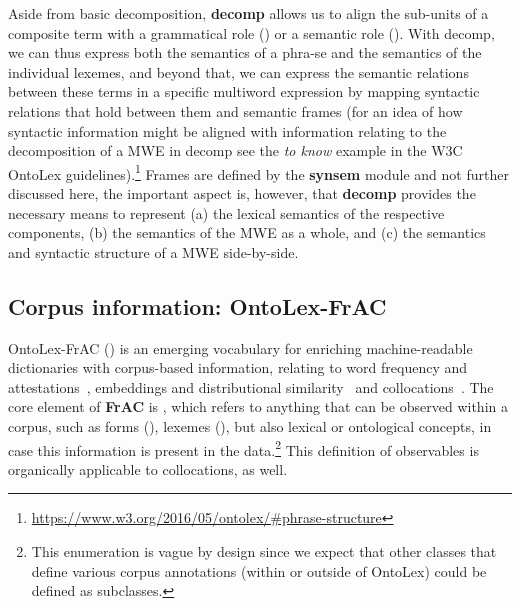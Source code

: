 \documentclass[output=paper,colorlinks,citecolor=brown]{langscibook}
\begin{document}
Aside from basic decomposition, \textbf{decomp} allows us to align the
sub-units of a composite term with a grammatical role () or a semantic role ().
With decomp, we can thus express both the semantics of a phra-se
and the semantics of the individual lexemes, and beyond that, we can express the semantic relations between these terms in a specific multiword expression by mapping syntactic relations that hold between them and semantic frames (for an idea of how syntactic information might be aligned with information relating to the decomposition of a MWE in decomp see the \textit{to know} example in the W3C OntoLex guidelines).\footnote{\url{https://www.w3.org/2016/05/ontolex/\#phrase-structure}} Frames are defined by the \textbf{synsem} module and not further discussed here, the important aspect is, however, that \textbf{decomp} provides the necessary means to represent
(a) the lexical semantics of the respective components,
(b) the semantics of the MWE as a whole, and
(c) the semantics and syntactic structure of a MWE side-by-side.


\subsection{Corpus information: OntoLex-FrAC} %
\label{section:ontolex-frac}
OntoLex-FrAC () \citep{chiarcos2022modelling} is an emerging vocabulary for enriching machine-readable dictionaries with corpus-based information,
relating to word frequency and attestations~\citep{chiarcos2020modelling}, embeddings and distributional similarity~\citep{chiarcos2021embeddings} and collocations~\citep{chiarcos2022modelling,chiarcos2022modellingGlobalex}.
The core element of \textbf{FrAC} is , which refers to anything that can be observed within a corpus, such as forms (), lexemes (), but also lexical or ontological concepts, in case this information is present in the data.\footnote{This enumeration is vague by design since we expect that other classes that define various corpus annotations (within or outside of OntoLex) could be defined as subclasses.}
This definition of observables is organically applicable to collocations, as well.
\end{document}

